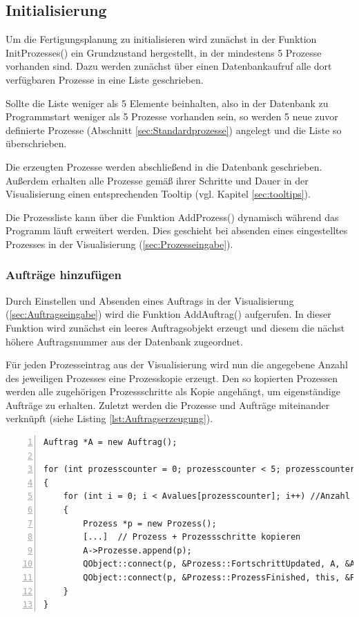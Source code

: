 \subsection{Initialisierung}
\label{sec:Fertigunginit}

Um die Fertigungsplanung zu initialisieren wird zunächst in der Funktion InitProzesses() ein Grundzustand hergestellt, in der mindestens 5 Prozesse vorhanden sind. Dazu werden zunächst über einen Datenbankaufruf alle dort verfügbaren Prozesse in eine Liste geschrieben. 

Sollte die Liste weniger als 5 Elemente beinhalten, also in der Datenbank zu Programmstart weniger als 5 Prozesse vorhanden sein, so werden 5 neue zuvor definierte Prozesse (Abschnitt \ref{sec:Standardprozesse}) angelegt und die Liste so überschrieben. 

Die erzeugten Prozesse werden abschließend in die Datenbank geschrieben. Außerdem erhalten alle Prozesse gemäß ihrer Schritte und Dauer in der Visualisierung einen entsprechenden Tooltip (vgl. Kapitel \ref{sec:tooltips}). 

Die Prozessliste kann über die Funktion AddProzess() dynamisch während das Programm läuft erweitert werden. Dies geschieht bei absenden eines eingestelltes Prozesses in der Visualisierung (\ref{sec:Prozesseingabe}). 

\subsubsection{Aufträge hinzufügen}

Durch Einstellen und Absenden eines Auftrags in der Visualisierung (\ref{sec:Auftragseingabe}) wird die Funktion AddAuftrag() aufgerufen. In dieser Funktion wird zunächst ein leeres Auftragsobjekt erzeugt und diesem die nächst höhere Auftragsnummer aus der Datenbank zugeordnet.  

Für jeden Prozesseintrag aus der Visualisierung wird nun die angegebene Anzahl des jeweiligen Prozesses eine Prozesskopie erzeugt. Den so kopierten Prozessen werden alle zugehörigen Prozessschritte als Kopie angehängt, um eigenständige Aufträge zu erhalten. Zuletzt werden die Prozesse und Aufträge miteinander verknüpft (siehe Listing \ref{lst:Auftragserzeugung}).

\begin{lstlisting}[frame=single, breaklines=true, numbers=left, stepnumber=2, firstnumber=1, numberstyle = \tiny, caption=Auftragserzeugung und Verknüpfungen,label=lst:Auftragserzeugung]
Auftrag *A = new Auftrag();

for (int prozesscounter = 0; prozesscounter < 5; prozesscounter++) //5 Prozess UI Elemente
{
    for (int i = 0; i < Avalues[prozesscounter]; i++) //Anzahl der eingegebenen Prozesszahl
    {
        Prozess *p = new Prozess();
        [...]  // Prozess + Prozessschritte kopieren
        A->Prozesse.append(p);
        QObject::connect(p, &Prozess::FortschrittUpdated, A, &Auftrag::UpdateFortschritt);
        QObject::connect(p, &Prozess::ProzessFinished, this, &Fertigungsplanung::StationReady);
    }
}
\end{lstlisting}

